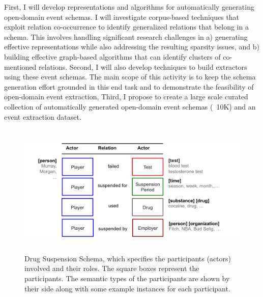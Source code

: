 First, I will develop representations and algorithms for automatically generating open-domain event schemas. I will investigate corpus-based techniques that exploit relation co-occurrence to identify generalized relations that belong in a schema. This involves handling significant research challenges in a) generating effective representations while also addressing the resulting sparsity issues, and b) building effective graph-based algorithms that can identify clusters of co-mentioned relations. Second, I will also develop techniques to build extractors using these event schemas. The main scope of this activity is to keep the schema generation effort grounded in this end task and to demonstrate the feasibility of open-domain event extraction, Third, I propose to create a large scale curated collection of automatically generated open-domain event schemas (~10K) and an event extraction dataset.
\begin{figure}[thb]
	\begin{center}
	\includegraphics[width=5.7in,height=2.5in]{figures/drug-schema} 	
	\caption{\label{fig:drug-schema} {Drug Suspension Schema, which specifies the participants (actors) involved and their roles. The square boxes represent the participants. The semantic types of the participants are shown by their side along with some example instances for each participant.}}
	\vspace{-2ex}
	\end{center}
\end{figure}


